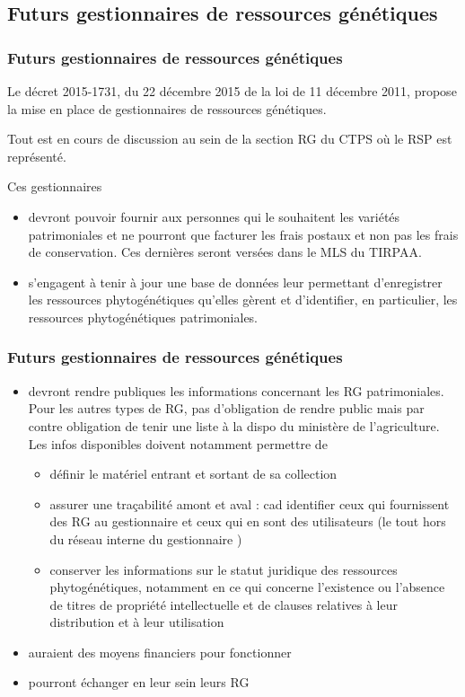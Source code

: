 \subsection{Futurs gestionnaires de ressources génétiques}
\begin{frame}
\frametitle{Futurs gestionnaires de ressources génétiques}

Le décret 2015-1731, du 22 décembre 2015 de la loi de 11 décembre 2011, propose la mise en place de gestionnaires de ressources génétiques.

\vfill

Tout est en cours de discussion au sein de la section RG du CTPS où le RSP est représenté.

\vfill


Ces gestionnaires 

\begin{itemize}
\item devront pouvoir fournir aux personnes qui le souhaitent les variétés patrimoniales et ne pourront que facturer les frais postaux et non pas les frais de conservation.
Ces dernières seront versées dans le MLS du TIRPAA.

\item s’engagent à tenir à jour une base de données leur permettant d’enregistrer les ressources phytogénétiques qu’elles gèrent et d’identifier, en particulier, les ressources phytogénétiques patrimoniales. 
\end{itemize}

\end{frame}

\begin{frame}
\frametitle{Futurs gestionnaires de ressources génétiques}

\begin{itemize}
\item devront rendre publiques les informations concernant les RG patrimoniales. Pour les autres types de RG, pas d'obligation de rendre public mais par contre obligation de tenir une liste à la dispo du ministère de l'agriculture. 
Les infos disponibles doivent notamment permettre de
\begin{itemize}
\item définir le matériel entrant et sortant de sa collection
\item assurer une traçabilité amont et aval : cad identifier ceux qui fournissent des RG  au gestionnaire et ceux qui en sont des utilisateurs (le tout hors du réseau interne du gestionnaire )  
\item conserver les informations sur le statut juridique des ressources phytogénétiques, notamment en ce qui concerne l’existence ou l’absence de titres de propriété intellectuelle et de clauses relatives à leur distribution et à leur utilisation
\end{itemize}
\item auraient des moyens financiers pour fonctionner
\item pourront échanger en leur sein leurs RG
\end{itemize}

\end{frame}

